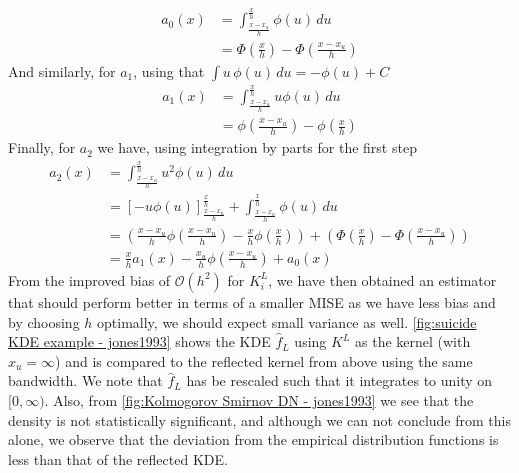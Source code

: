 \documentclass[../Thesis.tex]{subfiles}
\begin{document}
\begin{align*}
    a_0\left(x\right) & = \int_{\frac{x-x_u}{h}}^{\frac{x}{h}} \phi(u) \, du              \\
                      & = \Phi\left(\frac{x}{h}\right) - \Phi\left(\frac{x-x_u}{h}\right)
\end{align*}
And similarly, for $a_1$, using that $\int u \,\phi \left(u\right) \, du = - \phi\left(u\right) + C$
\begin{align*}
    a_1\left(x\right) & = \int_{\frac{x-x_u}{h}}^{\frac{x}{h}} u \phi(u) \, du           \\
                      & = \phi \left(\frac{x-x_u}{h}\right)-\phi\left(\frac{x}{h}\right)
\end{align*}
Finally, for $a_2$ we have, using integration by parts for the first step
\begin{align*}
    a_2\left(x\right) & = \int_{\frac{x-x_u}{h}}^{\frac{x}{h}} u^2 \phi(u) \, du                                                                                                                                    \\
                      & = \left[- u \phi \left(u\right)\right]_{\frac{x-x_u}{h}}^{\frac{x}{h}} + \int_{\frac{x-x_u}{h}}^{\frac{x}{h}} \phi \left(u\right) \, du                                                     \\
                      & = \left(\frac{x-x_u}{h} \phi\left(\frac{x - x_u}{h}\right) - \frac{x}{h} \phi\left(\frac{x}{h}\right)\right) + \left(\Phi\left(\frac{x}{h}\right) - \Phi\left(\frac{x-x_u}{h}\right)\right) \\
                      & = \frac{x}{h} a_1\left(x\right) - \frac{x_u}{h} \phi \left(\frac{x - x_u}{h}\right) + a_0\left(x\right)
\end{align*}
From the improved bias of $\mathcal{O} \left(h^2\right)$ for $K_i^L$, we have then obtained an estimator that should perform better in terms of a smaller MISE as we have less bias and by choosing $h$ optimally, we should expect small variance as well. \autoref{fig:suicide KDE example - jones1993} shows the KDE $\hat{f}_L$ using $K^L$ as the kernel (with $x_u = \infty$) and is compared to the reflected kernel from above using the same bandwidth. We note that $\hat{f}_L$ has be rescaled such that it integrates to unity on $[0,\infty)$. Also, from \autoref{fig:Kolmogorov Smirnov DN - jones1993} we see that the density is not statistically significant, and although we can not conclude from this alone, we observe that the deviation from the empirical distribution functions is less than that of the reflected KDE.
\end{document}
